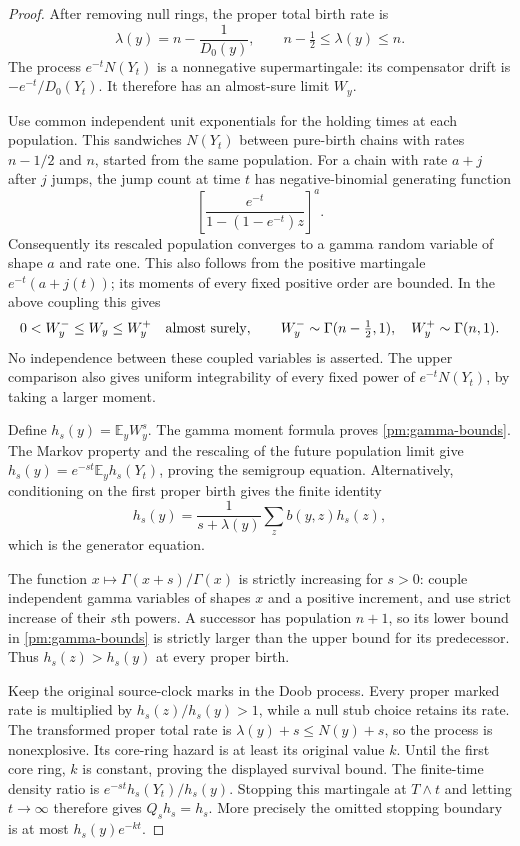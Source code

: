 \begin{proof}
After removing null rings, the proper total birth rate is
\[
 \lambda(y)=n-\frac1{D_0(y)},\qquad n-\tfrac12\le\lambda(y)\le n.
\]
The process $e^{-t}N(Y_t)$ is a nonnegative supermartingale: its
compensator drift is $-e^{-t}/D_0(Y_t)$.  It therefore has an almost-sure
limit $W_y$.

Use common independent unit exponentials for the holding times at each
population.  This sandwiches $N(Y_t)$ between pure-birth chains with
rates $n-1/2$ and $n$, started from the same population.  For a chain
with rate $a+j$ after $j$ jumps, the jump count at time $t$ has
negative-binomial generating function
\[
 \left[\frac{e^{-t}}{1-(1-e^{-t})z}\right]^a.
\]
Consequently its rescaled population converges to a gamma random
variable of shape $a$ and rate one.  This also follows from the
positive martingale $e^{-t}(a+j(t))$; its moments of every fixed
positive order are bounded.  In the above coupling this gives
\[
 0<W_y^-\le W_y\le W_y^+\quad\hbox{almost surely},
 \qquad W_y^-\sim\Gamma(n-\tfrac12,1),\quad
 W_y^+\sim\Gamma(n,1).
\]
No independence between these coupled variables is asserted.
The upper comparison also gives uniform integrability of every fixed
power of $e^{-t}N(Y_t)$, by taking a larger moment.

Define $h_s(y)=\mathbb E_y W_y^s$.  The gamma moment formula proves
\eqref{pm:gamma-bounds}.  The Markov property and the rescaling of the
future population limit give
$h_s(y)=e^{-st}\mathbb E_y h_s(Y_t)$, proving the semigroup equation.
Alternatively, conditioning on the first proper birth gives the finite
identity
\[
 h_s(y)=\frac1{s+\lambda(y)}\sum_z b(y,z)h_s(z),
\]
which is the generator equation.

The function $x\mapsto\Gamma(x+s)/\Gamma(x)$ is strictly increasing
for $s>0$: couple independent gamma variables of shapes $x$ and a
positive increment, and use strict increase of their $s$th powers.
A successor has population $n+1$, so its lower bound in
\eqref{pm:gamma-bounds} is strictly larger than the upper bound for
its predecessor.  Thus $h_s(z)>h_s(y)$ at every proper birth.

Keep the original source-clock marks in the Doob process.  Every
proper marked rate is multiplied by $h_s(z)/h_s(y)>1$, while a null
stub choice retains its rate.  The transformed proper total rate is
$\lambda(y)+s\le N(y)+s$, so the process is nonexplosive.  Its
core-ring hazard is at least its original value $k$.  Until the first
core ring, $k$ is constant, proving the displayed survival bound.
The finite-time density ratio is $e^{-st}h_s(Y_t)/h_s(y)$.
Stopping this martingale at $T\wedge t$ and letting $t\to\infty$
therefore gives $Q_s h_s=h_s$.  More precisely the omitted stopping
boundary is at most $h_s(y)e^{-kt}$.
\end{proof}

